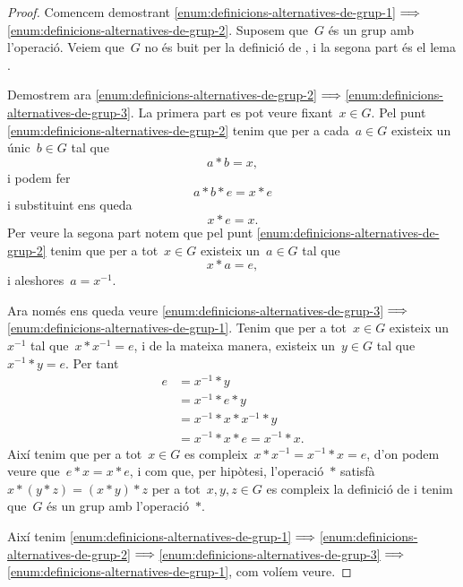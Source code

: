 \documentclass[../../main.tex]{subfiles}
\begin{document}
    \begin{proof}
        Comencem demostrant \eqref{enum:definicions-alternatives-de-grup-1}\(\implies\)\eqref{enum:definicions-alternatives-de-grup-2}.
        Suposem que~\(G\) és un grup amb l'operació.
        Veiem que~\(G\) no és buit per la definició de , i la segona part és el lema .

        Demostrem ara \eqref{enum:definicions-alternatives-de-grup-2}\(\implies\)\eqref{enum:definicions-alternatives-de-grup-3}.
        La primera part es pot veure fixant~\(x\in G\).
        Pel punt \eqref{enum:definicions-alternatives-de-grup-2} tenim que per a cada~\(a\in G\) existeix un únic~\(b\in G\) tal que
        \[
            a\ast b=x,
        \]
        i podem fer
        \[
            a\ast b\ast e=x\ast e
        \]
        i substituint ens queda
        \[
            x\ast e=x.
        \]
        Per veure la segona part notem que pel punt \eqref{enum:definicions-alternatives-de-grup-2} tenim que per a tot~\(x\in G\) existeix un~\(a\in G\) tal que
        \[
            x\ast a=e,
        \]
        i aleshores~\(a=x^{-1}\).

        Ara només ens queda veure \eqref{enum:definicions-alternatives-de-grup-3}\(\implies\)\eqref{enum:definicions-alternatives-de-grup-1}.
        Tenim que per a tot~\(x\in G\) existeix un~\(x^{-1}\) tal que~\(x\ast x^{-1}=e\), i de la mateixa manera, existeix un~\(y\in G\) tal que~\(x^{-1}\ast y=e\).
        Per tant
        \begin{align*}
        e&=x^{-1}\ast y\\
        &=x^{-1}\ast e\ast y\\
        &=x^{-1}\ast x\ast x^{-1}\ast y\\
        &=x^{-1}\ast x\ast e=x^{-1}\ast x.
        \end{align*}
        Així tenim que per a tot~\(x\in G\) es compleix~\(x\ast x^{-1}=x^{-1}\ast x=e\), d'on podem veure que~\(e\ast x=x\ast e\), i com que, per hipòtesi, l'operació~\(\ast\) satisfà~\(x\ast(y\ast z)=(x\ast y)\ast z\) per a tot~\(x,y,z\in G\) es compleix la definició de  i tenim que~\(G\) és un grup amb l'operació~\(\ast\).

        Així tenim \eqref{enum:definicions-alternatives-de-grup-1}\(\implies\)\eqref{enum:definicions-alternatives-de-grup-2}\(\implies\)\eqref{enum:definicions-alternatives-de-grup-3}\(\implies\)\eqref{enum:definicions-alternatives-de-grup-1}, com volíem veure.
    \end{proof}
\end{document}
